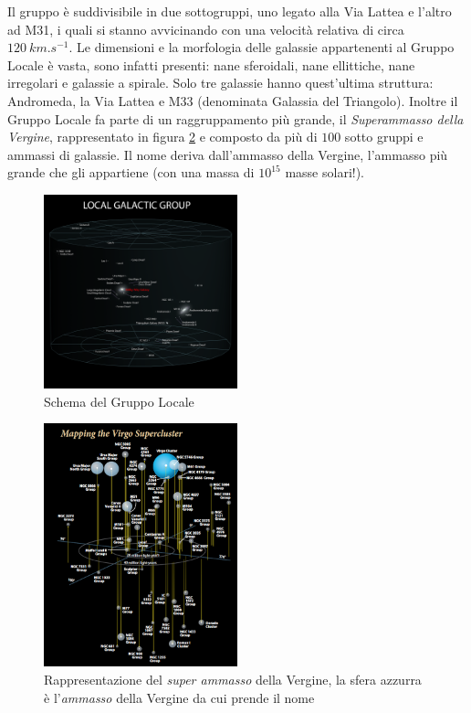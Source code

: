 \noindent Il gruppo è suddivisibile in due sottogruppi, uno legato alla Via Lattea e l’altro ad M31, i quali si stanno avvicinando con una velocità relativa di circa $\SI{120}{km.s^{-1}}$.
Le dimensioni e la morfologia delle galassie appartenenti al Gruppo Locale è vasta, sono infatti presenti: nane sferoidali, nane ellittiche, nane irregolari e galassie a spirale. Solo tre galassie hanno quest’ultima struttura: Andromeda, la Via Lattea e M33 (denominata Galassia del Triangolo).
Inoltre il Gruppo Locale fa parte di un raggruppamento più grande, il \emph{Superammasso della Vergine}, rappresentato in figura \ref{fig:virgo-cluster} e composto da più di $100$ sotto gruppi e ammassi di galassie. Il nome deriva dall’ammasso della Vergine, l'ammasso più grande che gli appartiene (con una massa di $10^{15}$ masse solari!).
\begin{figure}
    \centering
    \includegraphics[width = 0.5\textwidth]{immagini/Gruppo-Locale.PNG}
    \caption{Schema del Gruppo Locale}
    \label{fig:gruppo-locale}
\end{figure}
\begin{figure}
    \centering
    \includegraphics[width = 0.5\textwidth]{immagini/virgo-cluster.png}
    \caption{Rappresentazione del \emph{super ammasso} della Vergine, la sfera azzurra è l'\emph{ammasso} della Vergine da cui prende il nome}
    \label{fig:virgo-cluster}
\end{figure}
